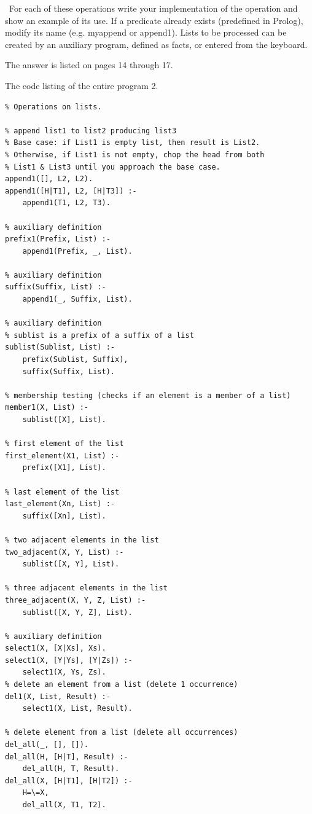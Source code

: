 \documentclass{article}
\begin{document}
	\rmfamily\
	For each of these operations write your implementation of the operation and show an example of its use. If a predicate already exists (predefined in Prolog), modify its name (e.g. myappend or append1).
	Lists to be processed can be created by an auxiliary program, defined as facts, or entered from the keyboard.
	\newline
	
	The answer is listed on pages 14 through 17.
	\newline

	
	\noindent The code listing of the entire program 2.
	
	\begin{verbatim}
% Operations on lists.

% append list1 to list2 producing list3
% Base case: if List1 is empty list, then result is List2.
% Otherwise, if List1 is not empty, chop the head from both 
% List1 & List3 until you approach the base case.
append1([], L2, L2).
append1([H|T1], L2, [H|T3]) :-
    append1(T1, L2, T3).

% auxiliary definition
prefix1(Prefix, List) :-
    append1(Prefix, _, List).

% auxiliary definition
suffix(Suffix, List) :-
    append1(_, Suffix, List).

% auxiliary definition
% sublist is a prefix of a suffix of a list
sublist(Sublist, List) :-
    prefix(Sublist, Suffix),
    suffix(Suffix, List).

% membership testing (checks if an element is a member of a list)
member1(X, List) :-
    sublist([X], List).

% first element of the list
first_element(X1, List) :-
    prefix([X1], List).

% last element of the list
last_element(Xn, List) :-
    suffix([Xn], List).

% two adjacent elements in the list
two_adjacent(X, Y, List) :-
    sublist([X, Y], List).

% three adjacent elements in the list
three_adjacent(X, Y, Z, List) :-
    sublist([X, Y, Z], List).

% auxiliary definition
select1(X, [X|Xs], Xs).
select1(X, [Y|Ys], [Y|Zs]) :-
    select1(X, Ys, Zs).
% delete an element from a list (delete 1 occurrence)
del1(X, List, Result) :-
    select1(X, List, Result).

% delete element from a list (delete all occurrences)
del_all(_, [], []).
del_all(H, [H|T], Result) :-
    del_all(H, T, Result).
del_all(X, [H|T1], [H|T2]) :-
    H=\=X,
    del_all(X, T1, T2).



\end{verbatim}
\end{document}
